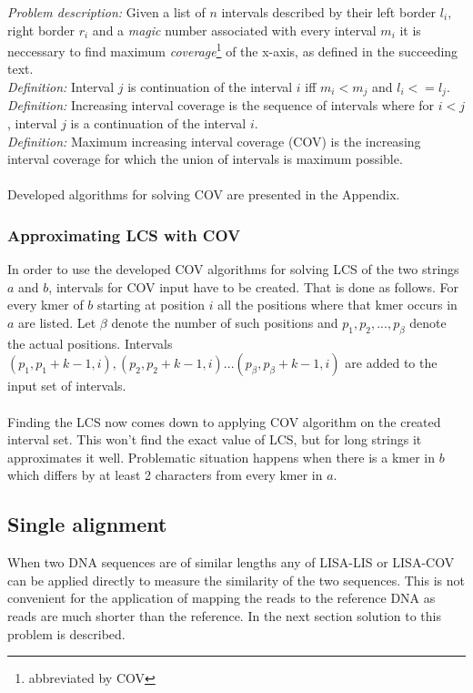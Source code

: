 \documentclass[times, utf8, diplomski]{fer}
\begin{document}
\emph{Problem description: } Given a list of $n$ intervals described by their left border $l_i$, right border $r_i$ and a \emph{magic} number associated with every interval $m_i$ it is neccessary to find maximum \emph{coverage}\footnote{abbreviated by COV} of the x-axis, as defined in the succeeding text.\\
\emph{Definition: } Interval $j$ is continuation of the interval $i$ iff $m_i<m_j$ and $l_i <= l_j$.\\
\emph{Definition: } Increasing interval coverage is the sequence of intervals where for $i<j$, interval $j$ is a continuation of the interval $i$.\\
\emph{Definition: } Maximum increasing interval coverage (COV) is the increasing interval coverage for which the union of intervals is maximum possible.\\
\\
Developed algorithms for solving COV are presented in the Appendix.

\subsubsection{Approximating LCS with COV}

In order to use the developed COV algorithms for solving LCS of the two strings $a$ and $b$, intervals for COV input have to be created. That is done as follows. For every kmer of $b$ starting at position $i$ all the positions where that kmer occurs in $a$ are listed. Let $\beta$ denote the number of such positions and $p_1,p_2,...,p_\beta$ denote the actual positions. Intervals $(p_1,p_1+k-1,i),(p_2,p_2+k-1,i)...(p_\beta, p_\beta+k-1,i)$ are added to the input set of intervals.\\
\\
Finding the LCS now comes down to applying COV algorithm on the created interval set. This won't find the exact value of LCS, but for long strings it approximates it well. Problematic situation happens when there is a kmer in $b$ which differs by at least 2 characters from every kmer in $a$.

\subsection{Single alignment}

When two DNA sequences are of similar lengths any of LISA-LIS or LISA-COV can be applied directly to measure the similarity of the two sequences. This is not convenient for the application of mapping the reads to the reference DNA as reads are much shorter than the reference. In the next section solution to this problem is described.
\end{document}

